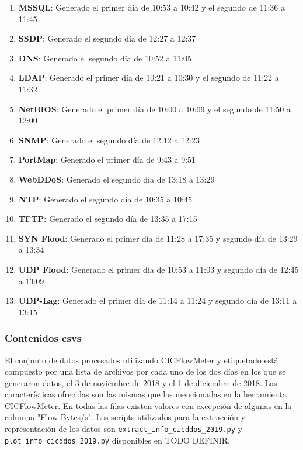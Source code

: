 \begin{enumerate}
    \item \textbf{MSSQL}: Generado el primer día de 10:53 a 10:42 y el segundo de 11:36 a 11:45
    \item \textbf{SSDP}: Generado el segundo día de 12:27 a 12:37
    \item \textbf{DNS}: Generado el segundo día de 10:52 a 11:05
    \item \textbf{LDAP}: Generado el primer día de 10:21 a 10:30 y el segundo de 11:22 a 11:32
    \item \textbf{NetBIOS}: Generado el primer día de 10:00 a 10:09 y el segundo de 11:50 a 12:00
    \item \textbf{SNMP}: Generado el segundo día de 12:12 a 12:23
    \item \textbf{PortMap}: Generado el primer día de 9:43 a 9:51
    \item \textbf{WebDDoS}: Generado el segundo día de 13:18 a 13:29
    \item \textbf{NTP}: Generado el segundo día de 10:35 a 10:45
    \item \textbf{TFTP}: Generado el segundo día de 13:35 a 17:15
    \item \textbf{SYN Flood}: Generado el primer día de 11:28 a 17:35 y segundo día de 13:29 a 13:34
    \item \textbf{UDP Flood}: Generado el primer día de 10:53 a 11:03 y segundo día de 12:45 a 13:09
    \item \textbf{UDP-Lag}: Generado el primer día de 11:14 a 11:24 y segundo día de 13:11 a 13:15
\end{enumerate}

\subsubsection{Contenidos csvs}

El conjunto de datos procesados utilizando CICFlowMeter y etiquetado está compuesto por una lista de archivos por cada uno de los dos días en los que se generaron datos, el 3 de noviembre de 2018 y el 1 de diciembre de 2018. Las características ofrecidas son las mismas que las mencionadas en la herramienta CICFlowMeter. En todas las filas existen valores con excepción de algunas en la columna "Flow Bytes/s". Los scripts utilizados para la extracción y representación de los datos son \texttt{extract\_info\_cicddos\_2019.py} y \texttt{plot\_info\_cicddos\_2019.py} disponibles en TODO DEFINIR.

